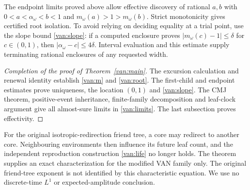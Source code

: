 The endpoint limits proved above allow effective discovery of rational
$a,b$ with $0<a<\alpha_\omega<b<1$ and
$m_\omega(a)>1>m_\omega(b)$.
Strict monotonicity gives certified root isolation.  To avoid relying
on deciding equality at a trial point, use the slope bound
\eqref{van:slope}: if a computed enclosure proves
$|m_\omega(c)-1|\le\delta$ for $c\in(0,1)$, then
$|\alpha_\omega-c|\le4\delta$.
Interval evaluation and this estimate supply terminating rational
enclosures of any requested width.

\begin{proof}[Completion of the proof of Theorem~\ref{van:main}]
The excursion calculation and renewal identity establish
\eqref{van:m} and \eqref{van:root}.  The first-child and endpoint
estimates prove uniqueness, the location $(0,1)$ and
\eqref{van:slope}.  The CMJ theorem, positive-event inheritance,
finite-family decomposition and leaf-clock argument give all
almost-sure limits in \eqref{van:limits}.  The last subsection
proves effectivity.
\end{proof}

\begin{remark}
\label{van:scope}
For the original isotropic-redirection friend tree, a core may
redirect to another core.  Neighbouring environments then influence
its future leaf count, and the independent reproduction construction
\eqref{van:life} no longer holds.  The theorem supplies an exact
characterization for the modified VAN family only.  The original friend-tree exponent is not identified by this
characteristic equation. We use no discrete-time $L^1$ or
expected-amplitude conclusion.
\end{remark}

